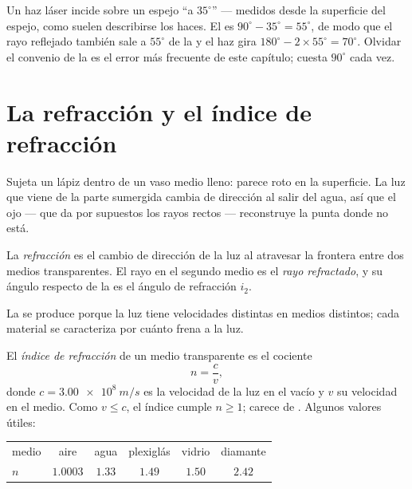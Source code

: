 \begin{example}\label{ex:g10:refraction:mirror}
Un haz láser incide sobre un espejo ``a $35^\circ$'' --- medidos desde
la superficie del espejo, como suelen describirse los haces. El  es $90^\circ - 35^\circ = 55^\circ$, de modo que el rayo
reflejado también sale a $55^\circ$ de la  y el haz gira
$180^\circ - 2 \times 55^\circ = 70^\circ$. Olvidar el convenio de la
 es el error más frecuente de este capítulo; cuesta $90^\circ$
cada vez.
\end{example}

\section{La refracción y el índice de refracción}

Sujeta un lápiz dentro de un vaso medio lleno: parece roto en la
superficie. La luz que viene de la parte sumergida cambia de dirección
al salir del agua, así que el ojo --- que da por supuestos los rayos
rectos --- reconstruye la punta donde no está.

\begin{definition}[Refracción]\label{def:g10:refraction:refraction}
La \emph{refracción} es el cambio de dirección de la
luz al atravesar la frontera entre dos medios transparentes. El rayo en
el segundo medio es el \emph{rayo refractado}, y
su ángulo respecto de la  es el ángulo de refracción $i_2$.
\end{definition}

La  se produce porque la luz tiene velocidades distintas en
medios distintos; cada material se caracteriza por cuánto frena a la
luz.

\begin{definition}\label{def:g10:refraction:index}
El \emph{índice de refracción} de un medio
transparente es el cociente
\[
n = \frac{c}{v},
\]
donde $c = \qty{3.00e8}{m/s}$ es la velocidad de la luz en el vacío y
$v$ su velocidad en el medio. Como $v \leq c$, el índice cumple
$n \geq 1$; carece de . Algunos valores útiles:
\begin{center}
\begin{tabular}{lccccc}
medio & aire & agua & plexiglás & vidrio & diamante \\
$n$ & $1.0003$ & $1.33$ & $1.49$ & $1.50$ & $2.42$ \\
\end{tabular}
\end{center}
\end{definition}

